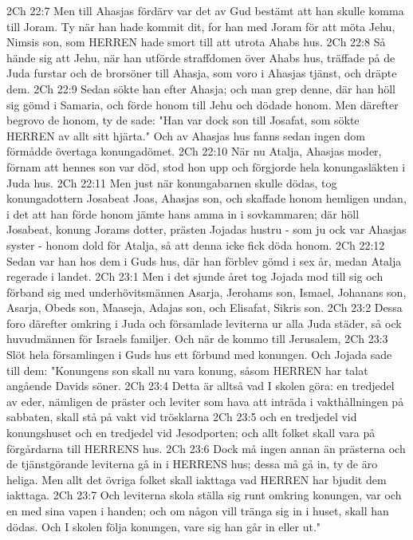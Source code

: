 2Ch 22:7  Men till Ahasjas fördärv var det av Gud bestämt att han skulle komma till Joram. Ty när han hade kommit dit, for han med Joram för att möta Jehu, Nimsis son, som HERREN hade smort till att utrota Ahabs hus.
2Ch 22:8  Så hände sig att Jehu, när han utförde straffdomen över Ahabs hus, träffade på de Juda furstar och de brorsöner till Ahasja, som voro i Ahasjas tjänst, och dräpte dem.
2Ch 22:9  Sedan sökte han efter Ahasja; och man grep denne, där han höll sig gömd i Samaria, och förde honom till Jehu och dödade honom. Men därefter begrovo de honom, ty de sade: "Han var dock son till Josafat, som sökte HERREN av allt sitt hjärta." Och av Ahasjas hus fanns sedan ingen dom förmådde övertaga konungadömet.
2Ch 22:10  När nu Atalja, Ahasjas moder, förnam att hennes son var död, stod hon upp och förgjorde hela konungasläkten i Juda hus.
2Ch 22:11  Men just när konungabarnen skulle dödas, tog konungadottern Josabeat Joas, Ahasjas son, och skaffade honom hemligen undan, i det att han förde honom jämte hans amma in i sovkammaren; där höll Josabeat, konung Jorams dotter, prästen Jojadas hustru - som ju ock var Ahasjas syster - honom dold för Atalja, så att denna icke fick döda honom.
2Ch 22:12  Sedan var han hos dem i Guds hus, där han förblev gömd i sex år, medan Atalja regerade i landet.
2Ch 23:1  Men i det sjunde året tog Jojada mod till sig och förband sig med underhövitsmännen Asarja, Jerohams son, Ismael, Johanans son, Asarja, Obeds son, Maaseja, Adajas son, och Elisafat, Sikris son.
2Ch 23:2  Dessa foro därefter omkring i Juda och församlade leviterna ur alla Juda städer, så ock huvudmännen för Israels familjer. Och när de kommo till Jerusalem,
2Ch 23:3  Slöt hela församlingen i Guds hus ett förbund med konungen. Och Jojada sade till dem: "Konungens son skall nu vara konung, såsom HERREN har talat angående Davids söner.
2Ch 23:4  Detta är alltså vad I skolen göra: en tredjedel av eder, nämligen de präster och leviter som hava att inträda i vakthållningen på sabbaten, skall stå på vakt vid trösklarna
2Ch 23:5  och en tredjedel vid konungshuset och en tredjedel vid Jesodporten; och allt folket skall vara på förgårdarna till HERRENS hus.
2Ch 23:6  Dock må ingen annan än prästerna och de tjänstgörande leviterna gå in i HERRENS hus; dessa må gå in, ty de äro heliga. Men allt det övriga folket skall iakttaga vad HERREN har bjudit dem iakttaga.
2Ch 23:7  Och leviterna skola ställa sig runt omkring konungen, var och en med sina vapen i handen; och om någon vill tränga sig in i huset, skall han dödas. Och I skolen följa konungen, vare sig han går in eller ut."
